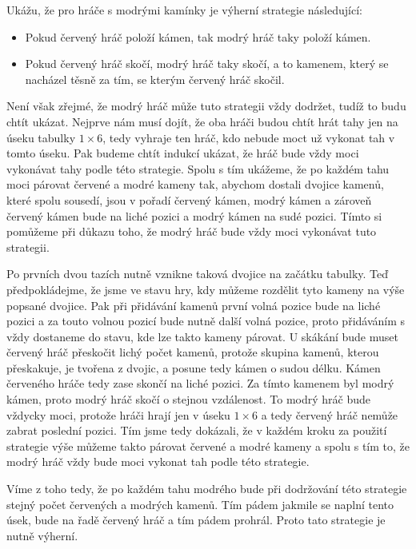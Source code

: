 \documentclass{fkssolpub}
\author{Ondřej Sedláček}
\begin{document}
Ukážu, že pro hráče s modrými kamínky je výherní strategie následující:

\begin{itemize}
	\item Pokud červený hráč položí kámen, tak modrý hráč taky položí kámen.
	\item Pokud červený hráč skočí, modrý hráč taky skočí, a to kamenem, který se nacházel těsně za tím, se kterým červený hráč skočil.
\end{itemize}

Není však zřejmé, že modrý hráč může tuto strategii vždy dodržet, tudíž to budu chtít ukázat. Nejprve nám musí dojít, že oba hráči budou chtít hrát tahy jen na úseku tabulky $1 \times 6$, tedy vyhraje ten hráč, kdo nebude moct už vykonat tah v tomto úseku. Pak budeme chtít indukcí ukázat, že hráč bude vždy moci vykonávat tahy podle této strategie. Spolu s tím ukážeme, že po každém tahu moci párovat červené a modré kameny tak, abychom dostali dvojice kamenů, které spolu sousedí, jsou v pořadí červený kámen, modrý kámen a zároveň červený kámen bude na liché pozici a modrý kámen na sudé pozici. Tímto si pomůžeme při důkazu toho, že modrý hráč bude vždy moci vykonávat tuto strategii.

Po prvních dvou tazích nutně vznikne taková dvojice na začátku tabulky. Teď předpokládejme, že jsme ve stavu hry, kdy můžeme rozdělit tyto kameny na výše popsané dvojice. Pak při přidávání kamenů první volná pozice bude na liché pozici a za touto volnou pozicí bude nutně další volná pozice, proto přidáváním s vždy dostaneme do stavu, kde lze takto kameny párovat. U skákání bude muset červený hráč přeskočit lichý počet kamenů, protože skupina kamenů, kterou přeskakuje, je tvořena z dvojic, a posune tedy kámen o sudou délku. Kámen červeného hráče tedy zase skončí na liché pozici. Za tímto kamenem byl modrý kámen, proto modrý hráč skočí o stejnou vzdálenost. To modrý hráč bude vždycky moci, protože hráči hrají jen v úseku $1 \times 6$ a tedy červený hráč nemůže zabrat poslední pozici. Tím jsme tedy dokázali, že v každém kroku za použití strategie výše můžeme takto párovat červené a modré kameny a spolu s tím to, že modrý hráč vždy bude moci vykonat tah podle této strategie.

Víme z toho tedy, že po každém tahu modrého bude při dodržování této strategie stejný počet červených a modrých kamenů. Tím pádem jakmile se naplní tento úsek, bude na řadě červený hráč a tím pádem prohrál. Proto tato strategie je nutně výherní.
\end{document}
